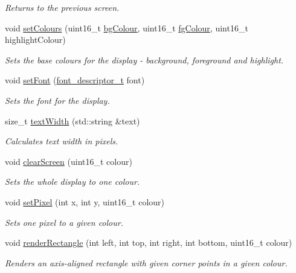 \begin{DoxyCompactItemize}
\begin{DoxyCompactList}\small\item\em Returns to the previous screen. \end{DoxyCompactList}\item 
void \mbox{\hyperlink{classDisplay_a8292ad87dddbf7090e074bcff5968d93}{set\+Colours}} (uint16\+\_\+t \mbox{\hyperlink{classDisplay_a23a0f9867d7ba82c45a3c612c84e0504}{bg\+Colour}}, uint16\+\_\+t \mbox{\hyperlink{classDisplay_aa6a2bd6e8f05a0794ff6b32c30723245}{fg\+Colour}}, uint16\+\_\+t highlight\+Colour)
\begin{DoxyCompactList}\small\item\em Sets the base colours for the display -\/ background, foreground and highlight. \end{DoxyCompactList}\item 
void \mbox{\hyperlink{classDisplay_afb2154f5edc1c2784ef43d0ddae9cd6d}{set\+Font}} (\mbox{\hyperlink{structfont__descriptor__t}{font\+\_\+descriptor\+\_\+t}} font)
\begin{DoxyCompactList}\small\item\em Sets the font for the display. \end{DoxyCompactList}\item 
size\+\_\+t \mbox{\hyperlink{classDisplay_a60f87a87dc86ca281c1095de69e981e6}{text\+Width}} (std\+::string \&text)
\begin{DoxyCompactList}\small\item\em Calculates text width in pixels. \end{DoxyCompactList}\item 
void \mbox{\hyperlink{classDisplay_a905f9f783556b52da4655c541a5e3ea0}{clear\+Screen}} (uint16\+\_\+t colour)
\begin{DoxyCompactList}\small\item\em Sets the whole display to one colour. \end{DoxyCompactList}\item 
void \mbox{\hyperlink{classDisplay_a34d1063149dc9f36c43afd5066b0b3ce}{set\+Pixel}} (int x, int y, uint16\+\_\+t colour)
\begin{DoxyCompactList}\small\item\em Sets one pixel to a given colour. \end{DoxyCompactList}\item 
void \mbox{\hyperlink{classDisplay_aeadae3356ab6ef6bc101dd5c3ee1317d}{render\+Rectangle}} (int left, int top, int right, int bottom, uint16\+\_\+t colour)
\begin{DoxyCompactList}\small\item\em Renders an axis-\/aligned rectangle with given corner points in a given colour. \end{DoxyCompactList}\item 

\end{DoxyCompactItemize}

